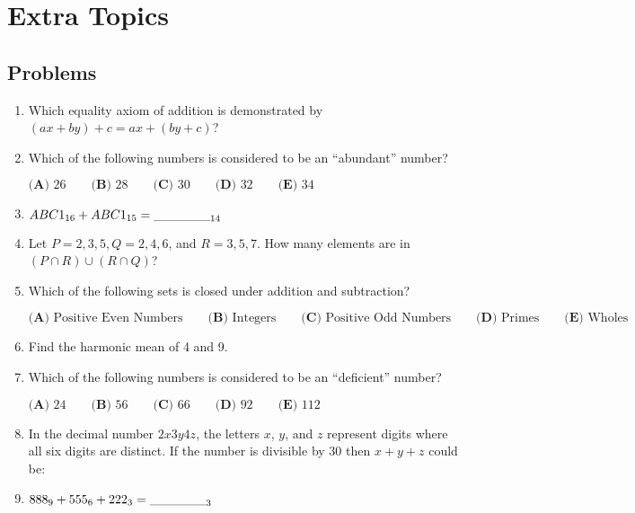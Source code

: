 \documentclass[../uilmath.tex]{subfiles}
\begin{document}
\chapter{Extra Topics}
\section*{Problems}
\begin{enumerate}[label=\bfseries\arabic*.]
    \item %
    Which equality axiom of addition is demonstrated by $(ax+by)+c=ax+(by+c)$?

    \item %
    Which of the following numbers is considered to be an ``abundant'' number?

    $\textbf{(A) } 26 \qquad \textbf{(B) } 28 \qquad \textbf{(C) } 30 \qquad \textbf{(D) } 32 \qquad \textbf{(E) } 34$

    \item %
    $ABC1_{16}+ABC1_{15}=\_\_\_\_\_\__{14}$

    \item %
    Let $P={2,3,5}, Q={2,4,6}$, and $R={3,5,7}$. How many elements are in $(P\cap R)\cup(R\cap Q)$?

    \item %
    Which of the following sets is closed under addition and subtraction?

    $\textbf{(A) } \text{Positive Even Numbers} \qquad \textbf{(B) } \text{Integers} \qquad \textbf{(C) } \text{Positive Odd Numbers} \qquad \textbf{(D) } \text{Primes} \qquad \textbf{(E) } \text{Wholes}$

    \item %
    Find the harmonic mean of 4 and 9.

    \item %
    Which of the following numbers is considered to be an ``deficient'' number?

    $\textbf{(A) } 24 \qquad \textbf{(B) } 56 \qquad \textbf{(C) } 66 \qquad \textbf{(D) } 92 \qquad \textbf{(E) } 112$

    \item %
    In the decimal number $2x3y4z$, the letters $x$, $y$, and $z$ represent digits where all six digits are distinct.
    If the number is divisible by 30 then $x+y+z$ could be: 

    \item %
    $888_9 + 555_6 + 222_3 = \_\_\_\_\_\__3$


\end{enumerate}
\end{document}
